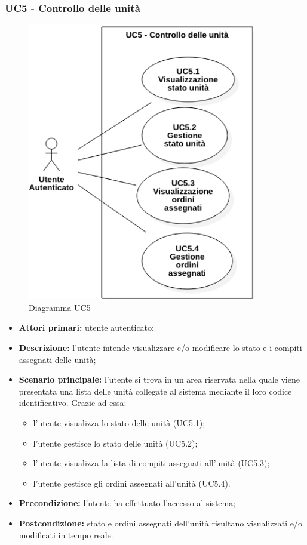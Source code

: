 \subsubsection{UC5 - Controllo delle unità}
\begin{figure}[h!]
    \includegraphics[width=10cm]{images/uc5.png}
    \caption{Diagramma UC5}
\end{figure}
\begin{itemize}
    \item \textbf{Attori primari:} utente autenticato;
    \item \textbf{Descrizione:} l'utente intende visualizzare e/o modificare lo stato e i compiti assegnati delle unità;
    \item \textbf{Scenario principale:} l'utente si trova in un area riservata nella quale viene presentata una lista delle unità collegate al sistema mediante il loro codice identificativo. Grazie ad essa:
    \begin{itemize}
        \item l'utente visualizza lo stato delle unità (UC5.1);
        \item l'utente gestisce lo stato delle unità (UC5.2);
        \item l'utente visualizza la lista di compiti assegnati all'unità (UC5.3);
        \item l'utente gestisce gli ordini assegnati all'unità (UC5.4).
    \end{itemize}
    \item \textbf{Precondizione:} l'utente ha effettuato l'accesso al sistema;
    \item \textbf{Postcondizione:} stato e ordini assegnati dell'unità risultano visualizzati e/o modificati in tempo reale.
\end{itemize}

